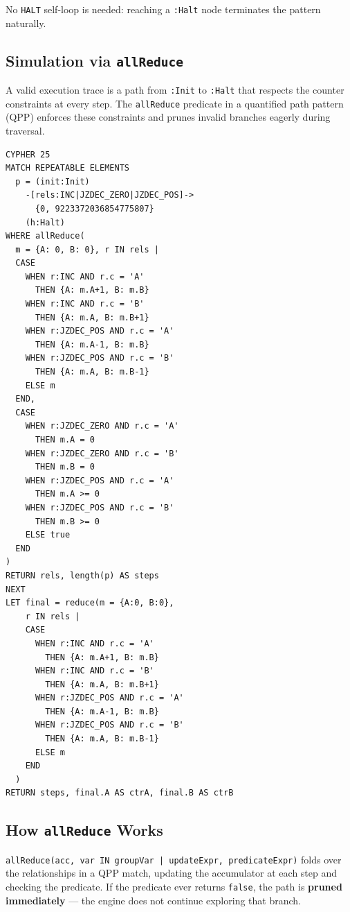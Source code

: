 \documentclass[11pt,a4paper]{article}
\begin{document}
No \texttt{HALT} self-loop is needed: reaching a \texttt{:Halt} node
terminates the pattern naturally.

\subsection{Simulation via \texttt{allReduce}}

A valid execution trace is a path from \texttt{:Init} to \texttt{:Halt}
that respects the counter constraints at every step. The
\texttt{allReduce} predicate in a quantified path pattern (QPP) enforces
these constraints and prunes invalid branches eagerly during traversal.

\begin{codeblock}
\begin{lstlisting}
CYPHER 25
MATCH REPEATABLE ELEMENTS
  p = (init:Init)
    -[rels:INC|JZDEC_ZERO|JZDEC_POS]->
      {0, 9223372036854775807}
    (h:Halt)
WHERE allReduce(
  m = {A: 0, B: 0}, r IN rels |
  CASE
    WHEN r:INC AND r.c = 'A'
      THEN {A: m.A+1, B: m.B}
    WHEN r:INC AND r.c = 'B'
      THEN {A: m.A, B: m.B+1}
    WHEN r:JZDEC_POS AND r.c = 'A'
      THEN {A: m.A-1, B: m.B}
    WHEN r:JZDEC_POS AND r.c = 'B'
      THEN {A: m.A, B: m.B-1}
    ELSE m
  END,
  CASE
    WHEN r:JZDEC_ZERO AND r.c = 'A'
      THEN m.A = 0
    WHEN r:JZDEC_ZERO AND r.c = 'B'
      THEN m.B = 0
    WHEN r:JZDEC_POS AND r.c = 'A'
      THEN m.A >= 0
    WHEN r:JZDEC_POS AND r.c = 'B'
      THEN m.B >= 0
    ELSE true
  END
)
RETURN rels, length(p) AS steps
NEXT
LET final = reduce(m = {A:0, B:0},
    r IN rels |
    CASE
      WHEN r:INC AND r.c = 'A'
        THEN {A: m.A+1, B: m.B}
      WHEN r:INC AND r.c = 'B'
        THEN {A: m.A, B: m.B+1}
      WHEN r:JZDEC_POS AND r.c = 'A'
        THEN {A: m.A-1, B: m.B}
      WHEN r:JZDEC_POS AND r.c = 'B'
        THEN {A: m.A, B: m.B-1}
      ELSE m
    END
  )
RETURN steps, final.A AS ctrA, final.B AS ctrB
\end{lstlisting}
\end{codeblock}

\subsection{How \texttt{allReduce} Works}

\texttt{allReduce(acc, var IN groupVar | updateExpr, predicateExpr)}
folds over the relationships in a QPP match, updating the accumulator at
each step and checking the predicate. If the predicate ever returns
\texttt{false}, the path is \textbf{pruned immediately} --- the engine
does not continue exploring that branch.
\end{document}
